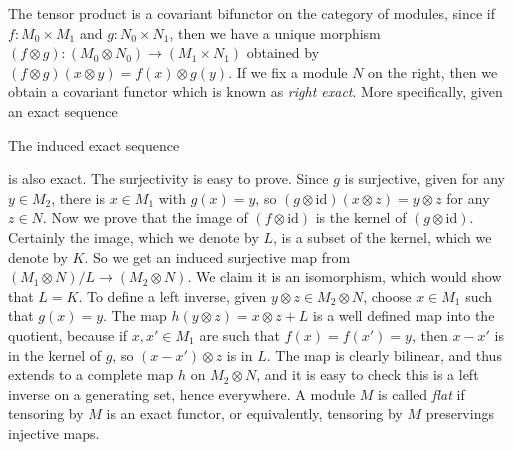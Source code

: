 The tensor product is a covariant bifunctor on the category of modules, since if $f: M_0 \times M_1$ and $g: N_0 \times N_1$, then we have a unique morphism $(f \otimes g): (M_0 \otimes N_0) \to (M_1 \times N_1)$ obtained by $(f \otimes g)(x \otimes y) = f(x) \otimes g(y)$. If we fix a module $N$ on the right, then we obtain a covariant functor which is known as \emph{right exact}. More specifically, given an exact sequence
%
\begin{center}
\end{center}
%
The induced exact sequence
%
\begin{center}
\end{center}
%
is also exact. The surjectivity is easy to prove. Since $g$ is surjective, given for any $y \in M_2$, there is $x \in M_1$ with $g(x) = y$, so $(g \otimes \text{id})(x \otimes z) = y \otimes z$ for any $z \in N$. Now we prove that the image of $(f \otimes \text{id})$ is the kernel of $(g \otimes \text{id})$. Certainly the image, which we denote by $L$, is a subset of the kernel, which we denote by $K$. So we get an induced surjective map from $(M_1 \otimes N)/L \to (M_2 \otimes N)$. We claim it is an isomorphism, which would show that $L = K$. To define a left inverse, given $y \otimes z \in M_2 \otimes N$, choose $x \in M_1$ such that $g(x) = y$. The map $h(y \otimes z) = x \otimes z + L$ is a well defined map into the quotient, because if $x,x' \in M_1$ are such that $f(x) = f(x') = y$, then $x - x'$ is in the kernel of $g$, so $(x - x') \otimes z$ is in $L$. The map is clearly bilinear, and thus extends to a complete map $h$ on $M_2 \otimes N$, and it is easy to check this is a left inverse on a generating set, hence everywhere. A module $M$ is called \emph{flat} if tensoring by $M$ is an exact functor, or equivalently, tensoring by $M$ preservings injective maps.

